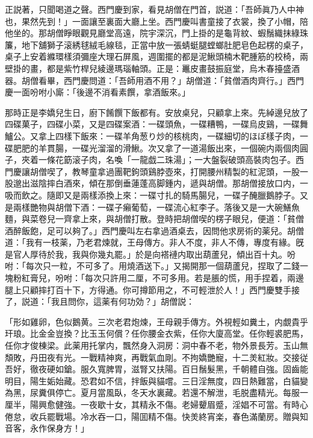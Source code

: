 正説著，只聞喝道之聲。西門慶到家，看見胡僧在門首，説道：「吾師眞乃人中神也，果然先到！」一面讓至裏面大廳上坐。西門慶叫書童接了衣裳，換了小帽，陪他坐的。那胡僧睜眼觀見廳堂高遠，院宇深沉，門上掛的是龜背紋、蝦鬚織抹綠珠簾，地下舖獅子滚綉毬絨毛線毯，正當中放一張蜻蜓腿螳螂肚肥皂色起楞的桌子，桌子上安着縧環樣須彌座大理石屏風，週圍擺的都是泥鰍頭楠木靶腫筋的校椅，兩壁掛的畫，都是紫竹桿兒綾邊瑪瑙軸頭。正是：鼉皮畫鼓振庭堂，烏木春擡盛酒器。胡僧看畢，西門慶問道：「吾師用酒不用？」胡僧道：「貧僧酒肉齊行。」西門慶一面吩咐小廝：「後邊不消看素饌，拿酒飯來。」

那時正是李嬌兒生日，廚下餚饌下飯都有。安放桌兒，只顧拿上來。先綽邊兒放了四碟菓子，四碟小菜，又是四碟案酒：一碟頭魚，一碟糟鴨，一碟烏皮鷄，一碟舞鱸公。又拿上四樣下飯來：一碟羊角葱り炒的核桃肉，一碟細切的ほぽ樣子肉，一碟肥肥的羊貫腸，一碟光溜溜的滑鰍。次又拿了一道湯飯出來，一個碗内兩個肉圓子，夾着一條花筯滚子肉，名喚「一龍戯二珠湯」；一大盤裂破頭高裝肉包子。西門慶讓胡僧喫了，教琴童拿過團靶鉤頭鷄脖壺來，打開腰州精製的紅泥頭，一股一股邈出滋陰摔白酒來，傾在那倒垂蓮蓬高脚鍾内，遞與胡僧。那胡僧接放口内，一吸而飲之。隨即又是兩樣添換上來：一碟寸扎的騎馬腸兒，一碟子醃臘鵝脖子。又是兩樣艷物與胡僧下酒：一碟子癩葡萄，一碟流心紅李子。落後又是一大碗鱔魚麵，與菜卷兒一齊拿上來，與胡僧打散。登時把胡僧喫的楞子眼兒，便道：「貧僧酒醉飯飽，足可以夠了。」西門慶叫左右拿過酒桌去，因問他求房術的薬兒。胡僧道：「我有一枝薬，乃老君煉就，王母傳方。非人不度，非人不傳，專度有緣。旣是官人厚待於我，我與你幾丸罷。」於是向褡褳内取出葫蘆兒，傾出百十丸。吩咐：「每次只一粒，不可多了。用燒酒送下。」又揭開那一個葫蘆兒，捏取了二錢一塊粉紅膏兒，吩咐：「每次只許用二厘，不可多用。若是脹的慌，用手捏着，兩邊腿上只顧摔打百十下，方得通。你可撙節用之，不可輕泄於人！」西門慶雙手接了，説道：「我且問你，這薬有何功効？」胡僧説：

\begin{myquote}[\markfont]
「形如雞卵，色似鵝黄。三次老君炮煉，王母親手傳方。外視輕如糞土，内覷貴乎玕琅。比金金豈換？比玉玉何償？任你腰金衣紫，任你大廈高堂。任你輕裘肥馬，任你才俊棟梁。此薬用托掌内，飄然身入洞房：洞中春不老，物外景長芳。玉山無頽敗，丹田夜有光。一戰精神爽，再戰氣血剛。不拘嬌艷寵，十二羙紅妝。交接従吾好，徹夜硬如鎗。服久寬脾胃，滋腎又扶陽。百日鬚髮黑，千朝體自強。固齒能明目，陽生姤始藏。恐君如不信，拌飯與貓嚐。三日淫無度，四日熱難當，白貓變為黑，尿糞俱停亡。夏月當風臥，冬天水裏藏。若還不解泄，毛脱盡精光。每服一厘半，陽興愈健強。一夜歇十女，其精永不傷。老婦顰眉蹙，淫娼不可當。有時心倦怠，收兵罷戰場。冷水吞一口，陽囬精不傷。快羙終宵楽，春色滿蘭房。贈與知音客，永作保身方！」
\end{myquote}

